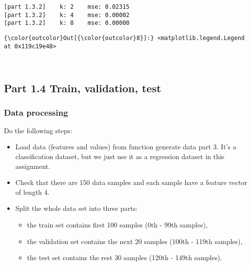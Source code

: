\documentclass[11pt]{article}
\providecommand{\tightlist}{%
      \setlength{\itemsep}{0pt}\setlength{\parskip}{0pt}}
\begin{document}
    \begin{Verbatim}[commandchars=\\\{\}]
[part 1.3.2]	k: 2	mse: 0.02315
[part 1.3.2]	k: 4	mse: 0.00002
[part 1.3.2]	k: 8	mse: 0.00000

    \end{Verbatim}

\begin{Verbatim}[commandchars=\\\{\}]
{\color{outcolor}Out[{\color{outcolor}8}]:} <matplotlib.legend.Legend at 0x119c19e48>
\end{Verbatim}
            
    \begin{center}
    \end{center}
    { \hspace*{\fill} \\}
    
    \subsection{Part 1.4 Train, validation,
test}\label{part-1.4-train-validation-test}

\subsubsection{Data processing}\label{data-processing}

Do the following steps:

\begin{itemize}
\tightlist
\item
  Load data (features and values) from function generate data part 3.
  It's a classification dataset, but we just use it as a regression
  dataset in this assignment.
\item
  Check that there are 150 data samples and each sample have a feature
  vector of length 4.
\item
  Split the whole data set into three parts:

  \begin{itemize}
  \tightlist
  \item
    the train set contains first 100 samples (0th - 99th samples),
  \item
    the validation set contains the next 20 samples (100th - 119th
    samples),
  \item
    the test set contains the rest 30 samples (120th - 149th samples).
  \end{itemize}
\end{itemize}
\end{document}
